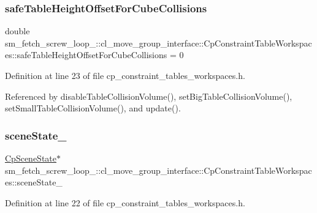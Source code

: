 \subsubsection{\texorpdfstring{safe\+Table\+Height\+Offset\+For\+Cube\+Collisions}{safeTableHeightOffsetForCubeCollisions}}
{\footnotesize\ttfamily double sm\+\_\+fetch\+\_\+screw\+\_\+loop\+\_\+::cl\+\_\+move\+\_\+group\+\_\+interface\+::\+Cp\+Constraint\+Table\+Workspaces\+::safe\+Table\+Height\+Offset\+For\+Cube\+Collisions = 0\hspace{0.3cm}{\ttfamily [private]}}



Definition at line 23 of file cp\+\_\+constraint\+\_\+tables\+\_\+workspaces.\+h.



Referenced by disable\+Table\+Collision\+Volume(), set\+Big\+Table\+Collision\+Volume(), set\+Small\+Table\+Collision\+Volume(), and update().

\mbox{\label{classsm__fetch__screw__loop__1_1_1cl__move__group__interface_1_1CpConstraintTableWorkspaces_ae49397b918179c999bd9d4b1c785713f}} 
\subsubsection{\texorpdfstring{scene\+State\+\_\+}{sceneState\_}}
{\footnotesize\ttfamily \hyperlink{classsm__fetch__screw__loop__1_1_1cl__perception__system_1_1CpSceneState}{Cp\+Scene\+State}$\ast$ sm\+\_\+fetch\+\_\+screw\+\_\+loop\+\_\+::cl\+\_\+move\+\_\+group\+\_\+interface\+::\+Cp\+Constraint\+Table\+Workspaces\+::scene\+State\+\_\+\hspace{0.3cm}{\ttfamily [private]}}



Definition at line 22 of file cp\+\_\+constraint\+\_\+tables\+\_\+workspaces.\+h.




